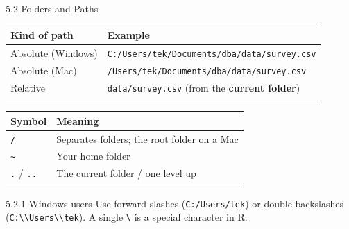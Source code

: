 \documentclass[
  ignorenonframetext,
  aspectratio=169,
]{beamer}
\newcounter{none} %
\begin{document}
\begin{frame}[fragile]{5.2 Folders and Paths}
\protect{}\label{folders-and-paths}
{\def\LTcaptype{none} %
\begin{longtable}[]{@{}ll@{}}
\toprule\noalign{}
Kind of path & Example \\
\midrule\noalign{}
\endhead
Absolute (Windows) &
\texttt{C:/Users/tek/Documents/dba/data/survey.csv} \\
Absolute (Mac) & \texttt{/Users/tek/Documents/dba/data/survey.csv} \\
Relative & \texttt{data/survey.csv} (from the \textbf{current
folder}) \\
\bottomrule\noalign{}
\end{longtable}
}

{\def\LTcaptype{none} %
\begin{longtable}[]{@{}ll@{}}
\toprule\noalign{}
Symbol & Meaning \\
\midrule\noalign{}
\endhead
\texttt{/} & Separates folders; the root folder on a Mac \\
\texttt{\textasciitilde{}} & Your home folder \\
\texttt{.} / \texttt{..} & The current folder / one level up \\
\bottomrule\noalign{}
\end{longtable}
}

\begin{alertblock}{5.2.1 Windows users}
\protect{}\label{windows-users}
Use forward slashes (\texttt{C:/Users/tek}) or double backslashes
(\texttt{C:\textbackslash{}\textbackslash{}Users\textbackslash{}\textbackslash{}tek}).
A single \texttt{\textbackslash{}} is a special character in R.
\end{alertblock}
\end{frame}
\end{document}
